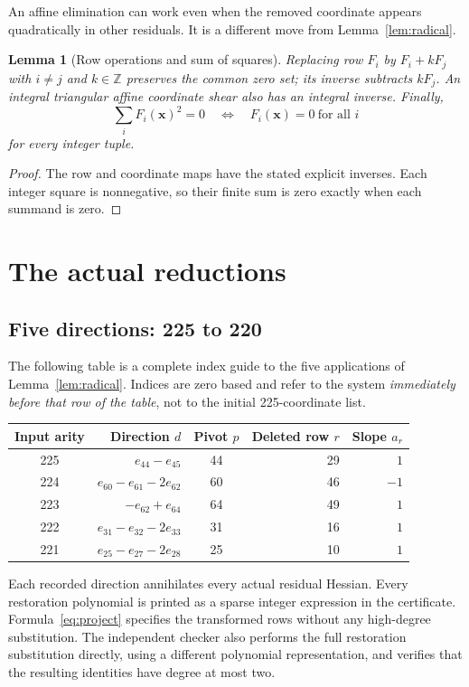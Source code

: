 \documentclass[10pt,letterpaper]{article}
\newtheorem{lemma}[theorem]{Lemma}
\theoremstyle{definition}\newtheorem{definition}[theorem]{Definition}
\newcommand{\Z}{\mathbb Z}\newcommand{\Q}{\mathbb Q}
\begin{document}
An affine elimination can work even when the removed coordinate appears
quadratically in other residuals. It is a different move from
Lemma~\ref{lem:radical}.

\begin{lemma}[Row operations and sum of squares]\label{lem:sos}
Replacing row $F_i$ by $F_i+kF_j$ with $i\ne j$ and $k\in\Z$ preserves
the common zero set; its inverse subtracts $kF_j$. An integral triangular
affine coordinate shear also has an integral inverse. Finally,
\[
\sum_i F_i(\mathbf x)^2=0\quad\Longleftrightarrow\quad
F_i(\mathbf x)=0\ \text{for all }i
\]
for every integer tuple.
\end{lemma}
\begin{proof}
The row and coordinate maps have the stated explicit inverses. Each
integer square is nonnegative, so their finite sum is zero exactly when
each summand is zero.
\end{proof}

\section{The actual reductions}
\label{sec:construction}

\subsection{Five directions: 225 to 220}
The following table is a complete index guide to the five applications
of Lemma~\ref{lem:radical}. Indices are zero based and refer to the system
\emph{immediately before that row of the table}, not to the initial
225-coordinate list.

\begin{center}
\begin{tabular}{crcrr}
\toprule
Input arity&Direction $d$&Pivot $p$&Deleted row $r$&Slope $a_r$\\
\midrule
225&$e_{44}-e_{45}$&44&29&$1$\\
224&$e_{60}-e_{61}-2e_{62}$&60&46&$-1$\\
223&$-e_{62}+e_{64}$&64&49&$1$\\
222&$e_{31}-e_{32}-2e_{33}$&31&16&$1$\\
221&$e_{25}-e_{27}-2e_{28}$&25&10&$1$\\
\bottomrule
\end{tabular}
\end{center}

Each recorded direction annihilates every actual residual Hessian.
Every restoration polynomial is printed as a sparse integer expression
in the certificate. Formula~\eqref{eq:project} specifies the transformed
rows without any high-degree substitution. The independent checker also
performs the full restoration substitution directly, using a different
polynomial representation, and verifies that the resulting identities
have degree at most two.
\end{document}
